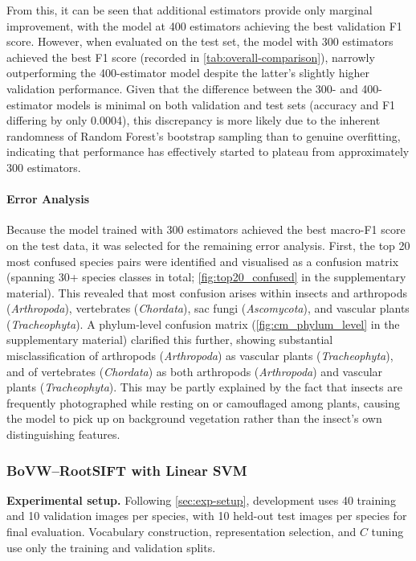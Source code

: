 From this, it can be seen that additional estimators provide only marginal improvement, with the model at 400 estimators achieving the best validation F1 score. However, when evaluated on the test set, the
model with 300 estimators achieved the best F1 score (recorded in \cref{tab:overall-comparison}), narrowly outperforming the 400-estimator model despite the latter's slightly higher validation performance.
Given that the difference between the 300- and 400-estimator models is minimal on both validation and test sets (accuracy and F1 differing by only 0.0004), this discrepancy is more likely due to the inherent
randomness of Random Forest's bootstrap sampling than to genuine overfitting, indicating that performance has effectively started to plateau from approximately 300 estimators.

\paragraph{Error Analysis}
\label{sec:rf-error-analysis}
Because the model trained with 300 estimators achieved the best macro-F1 score on the test data, it was selected for the remaining error analysis. First, the top 20 most confused species pairs were identified 
and visualised as a confusion matrix (spanning 30+ species classes in total; \cref{fig:top20_confused} in the supplementary material). This revealed that most confusion arises within insects and arthropods (\textit{Arthropoda}), vertebrates 
(\textit{Chordata}), sac fungi (\textit{Ascomycota}), and vascular plants (\textit{Tracheophyta}). A phylum-level confusion matrix (\cref{fig:cm_phylum_level} in the supplementary material) clarified this further, showing substantial 
misclassification of arthropods (\textit{Arthropoda}) as vascular plants (\textit{Tracheophyta}), and of vertebrates (\textit{Chordata}) as both arthropods (\textit{Arthropoda}) and vascular plants 
(\textit{Tracheophyta}). This may be partly explained by the fact that insects are frequently photographed while resting on or camouflaged among plants, causing the model to pick up on background vegetation 
rather than the insect's own distinguishing features.

\subsubsection{BoVW--RootSIFT with Linear SVM}
\label{sec:trad-svm}
 
\textbf{Experimental setup.}
Following \cref{sec:exp-setup}, development uses 40 training and 10 validation images per species, with 10 held-out test images per species for final evaluation. Vocabulary construction, representation selection, and $C$ tuning use only the training and validation splits.
 

